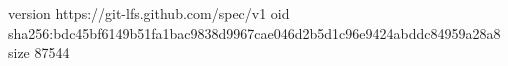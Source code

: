 version https://git-lfs.github.com/spec/v1
oid sha256:bdc45bf6149b51fa1bac9838d9967cae046d2b5d1c96e9424abddc84959a28a8
size 87544
